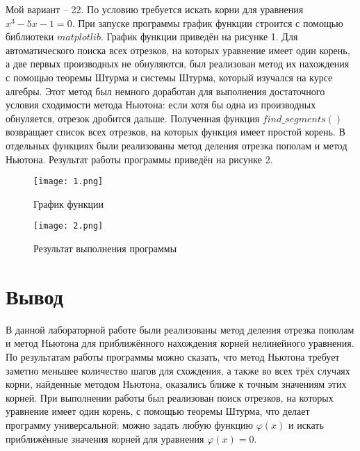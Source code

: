 \documentclass[a4paper, 14pt]{extarticle}
\begin{document}
Мой вариант -- 22. По условию требуется искать корни для уравнения $x^3 - 5x - 1 = 0$. При запуске программы график функции 
строится с помощью библиотеки $matplotlib$. График функции приведён на рисунке 1. Для автоматического 
поиска всех отрезков, на которых уравнение имеет один корень, а две первых производных не обнуляются, 
был реализован метод их нахождения с помощью 
теоремы Штурма и системы Штурма, который изучался на курсе алгебры. Этот метод был немного доработан для 
выполнения достаточного условия сходимости метода Ньютона: если хотя бы одна из производных обнуляется, отрезок дробится дальше.
Полученная функция $find\_segments()$ возвращает список всех отрезков, на которых функция имеет простой корень. В отдельных 
функциях были реализованы метод деления отрезка пополам и метод Ньютона. Результат работы программы приведён на рисунке 2.

\begin{figure}[H]
	
	\centering
	
	\texttt{[image: 1.png]}
	\captionsetup{justification=centering}
	\caption{График функции}
	
	\label{fig:mpr}
	
\end{figure}

\begin{figure}[H]
	
	\centering
	
	\texttt{[image: 2.png]}
	\captionsetup{justification=centering}
	\caption{Результат выполнения программы}
	
	\label{fig:mpr}
	
\end{figure}

\pagebreak

\section{Вывод}
В данной лабораторной работе были реализованы метод деления отрезка пополам и метод Ньютона для приближённого нахождения 
корней нелинейного уравнения. По результатам работы программы можно сказать, что метод Ньютона требует заметно меньшее 
количество шагов для схождения, а также во всех трёх случаях корни, найденные методом Ньютона, оказались ближе к точным 
значениям этих корней. При выполнении работы был реализован поиск отрезков, на которых уравнение имеет один корень, с 
помощью теоремы Штурма, что делает программу универсальной: можно задать любую функцию $\varphi(x)$ и искать приближённые 
значения корней для уравнения $\varphi(x) = 0$. 
\end{document}
